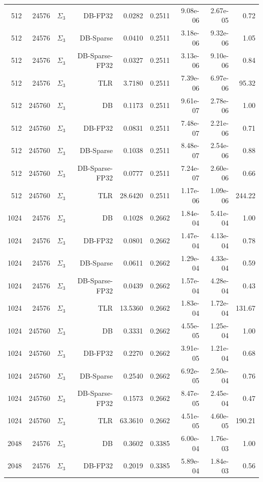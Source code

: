 \begin{tabular}{|r|r|r|r|r|r|r|r|r|}
  512 & 24576 & $\Sigma_3$ & DB-FP32 & 0.0282 & 0.2511 & 9.08e-06 & 2.67e-05 & 0.72 \\
  512 & 24576 & $\Sigma_3$ & DB-Sparse & 0.0410 & 0.2511 & 3.18e-06 & 9.32e-06 & 1.05 \\
  512 & 24576 & $\Sigma_3$ & DB-Sparse-FP32 & 0.0327 & 0.2511 & 3.13e-06 & 9.10e-06 & 0.84 \\
  512 & 24576 & $\Sigma_3$ & TLR & 3.7180 & 0.2511 & 7.39e-06 & 6.97e-06 & 95.32 \\
  512 & 245760 & $\Sigma_3$ & DB & 0.1173 & 0.2511 & 9.61e-07 & 2.78e-06 & 1.00 \\
  512 & 245760 & $\Sigma_3$ & DB-FP32 & 0.0831 & 0.2511 & 7.48e-07 & 2.21e-06 & 0.71 \\
  512 & 245760 & $\Sigma_3$ & DB-Sparse & 0.1038 & 0.2511 & 8.48e-07 & 2.54e-06 & 0.88 \\
  512 & 245760 & $\Sigma_3$ & DB-Sparse-FP32 & 0.0777 & 0.2511 & 7.24e-07 & 2.60e-06 & 0.66 \\
  512 & 245760 & $\Sigma_3$ & TLR & 28.6420 & 0.2511 & 1.17e-06 & 1.09e-06 & 244.22 \\
  1024 & 24576 & $\Sigma_3$ & DB & 0.1028 & 0.2662 & 1.84e-04 & 5.41e-04 & 1.00 \\
  1024 & 24576 & $\Sigma_3$ & DB-FP32 & 0.0801 & 0.2662 & 1.47e-04 & 4.13e-04 & 0.78 \\
  1024 & 24576 & $\Sigma_3$ & DB-Sparse & 0.0611 & 0.2662 & 1.29e-04 & 4.33e-04 & 0.59 \\
  1024 & 24576 & $\Sigma_3$ & DB-Sparse-FP32 & 0.0439 & 0.2662 & 1.57e-04 & 4.28e-04 & 0.43 \\
  1024 & 24576 & $\Sigma_3$ & TLR & 13.5360 & 0.2662 & 1.83e-04 & 1.72e-04 & 131.67 \\
  1024 & 245760 & $\Sigma_3$ & DB & 0.3331 & 0.2662 & 4.55e-05 & 1.25e-04 & 1.00 \\
  1024 & 245760 & $\Sigma_3$ & DB-FP32 & 0.2270 & 0.2662 & 3.91e-05 & 1.21e-04 & 0.68 \\
  1024 & 245760 & $\Sigma_3$ & DB-Sparse & 0.2540 & 0.2662 & 6.92e-05 & 2.50e-04 & 0.76 \\
  1024 & 245760 & $\Sigma_3$ & DB-Sparse-FP32 & 0.1573 & 0.2662 & 8.47e-05 & 2.45e-04 & 0.47 \\
  1024 & 245760 & $\Sigma_3$ & TLR & 63.3610 & 0.2662 & 4.51e-05 & 4.60e-05 & 190.21 \\
  2048 & 24576 & $\Sigma_3$ & DB & 0.3602 & 0.3385 & 6.00e-04 & 1.76e-03 & 1.00 \\
  2048 & 24576 & $\Sigma_3$ & DB-FP32 & 0.2019 & 0.3385 & 5.89e-04 & 1.84e-03 & 0.56 \\

\end{tabular}

